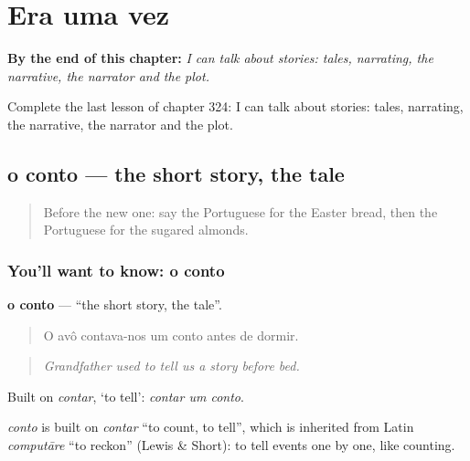
\chapter{Era uma vez}
\label{ch:pt-era-uma-vez}

\begin{chapteropening}
\textbf{By the end of this chapter:} \emph{I can talk about stories: tales, narrating, the narrative, the narrator and the plot.}

Complete the last lesson of chapter 324: I can talk about stories: tales, narrating, the narrative, the narrator and the plot.
\end{chapteropening}

\section[o conto]{o conto — the short story, the tale}

\label{lesson:PT-C324-conto}



\begin{quote}
Before the new one: say the Portuguese for the Easter bread, then the Portuguese for the sugared almonds.
\end{quote}

\subsection*{You'll want to know: o conto}
\textbf{o conto} — \textquotedblleft{}the short story, the tale\textquotedblright{}.

\begin{quote}
O avô contava-nos um conto antes de dormir.
\end{quote}

\begin{quote}
\emph{Grandfather used to tell us a story before bed.}
\end{quote}

Built on \emph{contar}, ‘to tell’: \emph{contar um conto}.

\begin{cousinweb}
\emph{conto} is built on \emph{contar} \textquotedblleft{}to count, to tell\textquotedblright{}, which is inherited from Latin \emph{computāre} \textquotedblleft{}to reckon\textquotedblright{} (Lewis \& Short): to tell events one by one, like counting.
\end{cousinweb}

